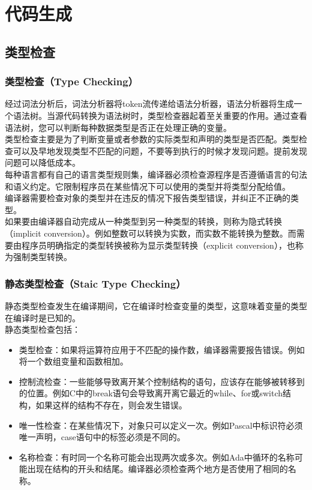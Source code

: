 \chapter{代码生成}

\section{类型检查}

\subsection{类型检查（Type Checking）}

经过词法分析后，词法分析器将token流传递给语法分析器，语法分析器将生成一个语法树。当源代码转换为语法树时，类型检查器起着至关重要的作用。通过查看语法树，您可以判断每种数据类型是否正在处理正确的变量。\\

类型检查主要是为了判断变量或者参数的实际类型和声明的类型是否匹配。类型检查可以及早地发现类型不匹配的问题，不要等到执行的时候才发现问题。提前发现问题可以降低成本。\\

每种语言都有自己的语言类型规则集，编译器必须检查源程序是否遵循语言的句法和语义约定。它限制程序员在某些情况下可以使用的类型并将类型分配给值。\\

编译器需要检查对象的类型并在违反的情况下报告类型错误，并纠正不正确的类型。\\

如果要由编译器自动完成从一种类型到另一种类型的转换，则称为隐式转换（implicit conversion）。例如整数可以转换为实数，而实数不能转换为整数。而需要由程序员明确指定的类型转换被称为显示类型转换（explicit conversion），也称为强制类型转换。\\

\subsection{静态类型检查（Staic Type Checking）}

静态类型检查发生在编译期间，它在编译时检查变量的类型，这意味着变量的类型在编译时是已知的。\\

静态类型检查包括：

\begin{itemize}
    \item 类型检查：如果将运算符应用于不匹配的操作数，编译器需要报告错误。例如将一个数组变量和函数相加。

    \item 控制流检查：一些能够导致离开某个控制结构的语句，应该存在能够被转移到的位置。例如C中的break语句会导致离开离它最近的while、for或switch结构，如果这样的结构不存在，则会发生错误。

    \item 唯一性检查：在某些情况下，对象只可以定义一次。例如Pascal中标识符必须唯一声明，case语句中的标签必须是不同的。

    \item 名称检查：有时同一个名称可能会出现两次或多次。例如Ada中循环的名称可能出现在结构的开头和结尾。编译器必须检查两个地方是否使用了相同的名称。
\end{itemize}


